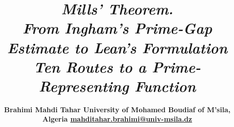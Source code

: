 \documentclass[11pt,reqno]{amsart}
\makeatletter
\theoremstyle{redplain}
\let\orig@maketitle\maketitle
\renewcommand{\maketitle}{\begingroup\let\MakeUppercase\@firstofone\let\uppercase\@firstofone\orig@maketitle\endgroup}
\numberwithin{equation}{section}
\makeatother
\begin{document}
	\title{\bfseries{\huge \emph{Mills' Theorem.}}\\
		[12pt]{\Large \emph{From Ingham's Prime-Gap Estimate to Lean's Formulation}}%
		\\
		[6pt]{\Large \emph{Ten Routes to a Prime-Representing Function}}}
	\author{%
		\bfseries{\large \hspace{1.2in} Brahimi Mahdi Tahar\newline\text{ \ 
			} \newline\text{ \  } \hspace{0.5in}\text{ \  } University of Mohamed
			Boudiaf of M'sila, Algeria\newline\text{ \  }
			\newline\href{mailto:mahditahar.brahimi@univ-msila.dz}{mahditahar.brahimi@univ-msila.dz}}%
	}
	\maketitle
	
\end{document}

